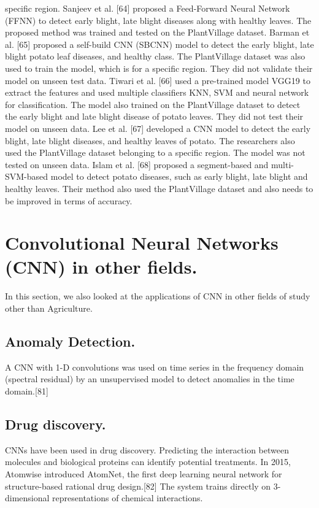 \documentclass[11pt]{report}
\begin{document}
specific region. Sanjeev et al. [64] proposed a Feed-Forward Neural Network (FFNN) to
detect early blight, late blight diseases along with healthy leaves. The proposed method
was trained and tested on the PlantVillage dataset. Barman et al. [65] proposed a self-build
CNN (SBCNN) model to detect the early blight, late blight potato leaf diseases, and healthy
class. The PlantVillage dataset was also used to train the model, which is for a specific
region. They did not validate their model on unseen test data. Tiwari et al. [66] used a
pre-trained model VGG19 to extract the features and used multiple classifiers KNN, SVM
and neural network for classification. The model also trained on the PlantVillage dataset to
detect the early blight and late blight disease of potato leaves. They did not test their model
on unseen data. Lee et al. [67] developed a CNN model to detect the early blight, late blight
diseases, and healthy leaves of potato. The researchers also used the PlantVillage dataset
belonging to a specific region. The model was not tested on unseen data. Islam et al. [68]
proposed a segment-based and multi-SVM-based model to detect potato diseases, such as
early blight, late blight and healthy leaves. Their method also used the PlantVillage dataset
and also needs to be improved in terms of accuracy.\\

\section{Convolutional Neural Networks (CNN) in other fields.}
In this section, we also looked at the applications of CNN in other fields of study other than Agriculture.\\

\subsection{Anomaly Detection.}
A CNN with 1-D convolutions was used on time series in the frequency domain (spectral residual) by an unsupervised model to detect anomalies in the time domain.[81] 

\subsection{Drug discovery.}
CNNs have been used in drug discovery. Predicting the interaction between molecules and biological proteins can identify potential treatments. In 2015, Atomwise introduced AtomNet, the first deep learning neural network for structure-based rational drug design.[82] The system trains directly on 3-dimensional representations of chemical interactions.\\
\end{document}
